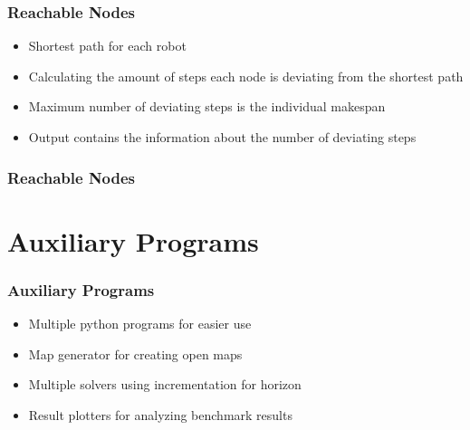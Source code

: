 \documentclass{beamer}
\begin{document}
\begin{frame}
\frametitle{Reachable Nodes}
\begin{itemize}
\item<2-> Shortest path for each robot
\medskip
\item<3-> Calculating the amount of steps each node is deviating from the shortest path
\medskip
\item<4-> Maximum number of deviating steps is the individual makespan
\medskip
\item<5-> Output contains the information about the number of deviating steps
\end{itemize}
\end{frame}

\begin{frame}
\frametitle{Reachable Nodes}
\begin{figure}[h]
\end{figure}
\end{frame}

\section{Auxiliary Programs}
\begin{frame}
\frametitle{Auxiliary Programs}
\begin{itemize}
\item<2-> Multiple python programs for easier use
\medskip
\item<3-> Map generator for creating open maps
\medskip
\item<4-> Multiple solvers using incrementation for horizon
\medskip
\item<5-> Result plotters for analyzing benchmark results
\end{itemize}
\end{frame}
\end{document}
